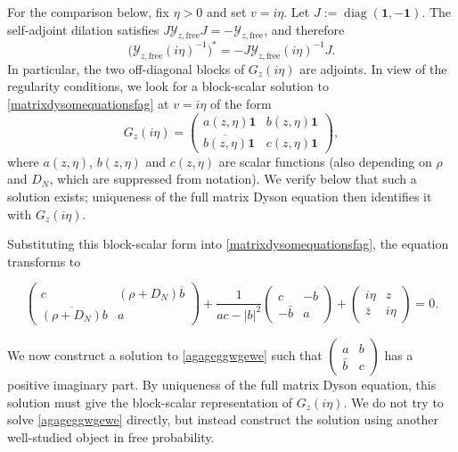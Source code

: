 \documentclass[11pt,reqno]{amsart}
\theoremstyle{plain}
\theoremstyle{remark}
\numberwithin{equation}{section}
\begin{document}
For the comparison below, fix $\eta>0$ and set $v=i\eta$. Let $J:=\operatorname{diag}(\mathbf{1},-\mathbf{1})$. The self-adjoint dilation satisfies $J\mathcal{Y}_{z,\text{free}}J=-\mathcal{Y}_{z,\text{free}}$, and therefore
$$
\big(\mathcal{Y}_{z,\text{free}}(i\eta)^{-1}\big)^*=-J\mathcal{Y}_{z,\text{free}}(i\eta)^{-1}J.
$$
In particular, the two off-diagonal blocks of $G_z(i\eta)$ are adjoints. In view of the regularity conditions, we look for a block-scalar solution to \eqref{matrixdysomequationsfag} at $v=i\eta$ of the form
\begin{equation}\label{definitiongzeta}
G_z(i\eta)=\begin{pmatrix}
    a(z,\eta) \mathbf{1}& b(z,\eta)\mathbf{1}\\ \overline{b(z,\eta)}\mathbf{1}&c(z,\eta)\mathbf{1}
\end{pmatrix},
\end{equation} where $a(z,\eta)$, $b(z,\eta)$ and $c(z,\eta)$ are scalar functions (also depending on $\rho$ and $D_N$, which are suppressed from notation). We verify below that such a solution exists; uniqueness of the full matrix Dyson equation then identifies it with $G_z(i\eta)$.

Substituting this block-scalar form into \eqref{matrixdysomequationsfag}, the equation transforms to

\begin{equation} \label{agageggwgewe}
\begin{pmatrix}
    c&(\rho+D_N)\overline{b}\\\overline{(\rho+D_N)}b&a
\end{pmatrix}
+
    \frac{1}{ac-|b|^2}\begin{pmatrix}
        c&-b\\-\bar{b}&a
    \end{pmatrix}+\begin{pmatrix}
        i\eta&z\\\bar{z}&i\eta
    \end{pmatrix}=0.
\end{equation}

We now construct a solution to \eqref{agageggwgewe} such that $\begin{pmatrix}
    a&b\\\bar{b}&c
\end{pmatrix}$ has a positive imaginary part. By uniqueness of the full matrix Dyson equation, this solution must give the block-scalar representation of $G_z(i\eta)$. We do not try to solve \eqref{agageggwgewe} directly, but instead construct the solution using another well-studied object in free probability.
\end{document}
